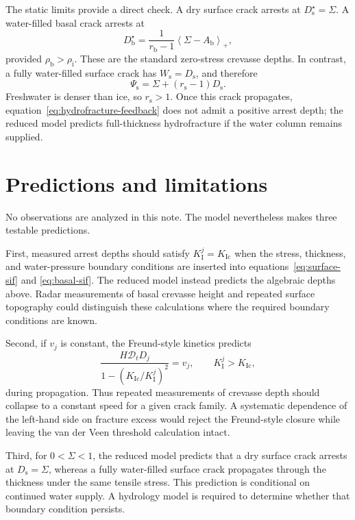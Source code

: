 \documentclass[11pt]{article}
\newcommand{\Dt}{\mathcal{D}_t}
\newcommand{\pos}[1]{\left\langle #1\right\rangle_{+}}
\newcommand{\rmi}{\mathrm{i}}
\newcommand{\rms}{\mathrm{s}}
\newcommand{\rmb}{\mathrm{b}}
\newcommand{\KI}[1]{K_{\mathrm{I}}^{#1}}
\newcommand{\KIc}{K_{\mathrm{Ic}}}
\begin{document}
The static limits provide a direct check.  A dry surface crack arrests at
\(D_{\rms}^{\star}=\Sigma\).  A water-filled basal crack arrests at
\begin{equation}
 D_{\rmb}^{\star}
 =\frac{1}{r_{\rmb}-1}\pos{\Sigma-A_{\rmb}},
 \label{eq:basal-arrest}
\end{equation}
provided \(\rho_{\rmb}>\rho_{\rmi}\).  These are the standard zero-stress
crevasse depths.  In contrast, a fully water-filled surface crack has
\(W_{\rms}=D_{\rms}\), and therefore
\begin{equation}
 \Psi_{\rms}=\Sigma+(r_{\rms}-1)D_{\rms}.
 \label{eq:hydrofracture-feedback}
\end{equation}
Freshwater is denser than ice, so \(r_{\rms}>1\).  Once this crack propagates,
equation~\eqref{eq:hydrofracture-feedback} does not admit a positive arrest
depth; the reduced model predicts full-thickness hydrofracture if the water
column remains supplied.

\section{Predictions and limitations}

No observations are analyzed in this note.  The model nevertheless makes
three testable predictions.

First, measured arrest depths should satisfy \(\KI{j}=\KIc\) when the stress,
thickness, and water-pressure boundary conditions are inserted into
equations~\eqref{eq:surface-sif} and \eqref{eq:basal-sif}.  The reduced model
instead predicts the algebraic depths above.  Radar measurements of basal
crevasse height and repeated surface topography could distinguish these
calculations where the required boundary conditions are known.

Second, if \(v_j\) is constant, the Freund-style kinetics predicts
\begin{equation}
 \frac{H\Dt D_j}{1-(\KIc/\KI{j})^2}=v_j,
 \qquad \KI{j}>\KIc,
 \label{eq:rate-prediction}
\end{equation}
during propagation.  Thus repeated measurements of crevasse depth should
collapse to a constant speed for a given crack family.  A systematic
dependence of the left-hand side on fracture excess would reject the
Freund-style closure while leaving the van der Veen threshold calculation
intact.

Third, for \(0<\Sigma<1\), the reduced model predicts that a dry surface crack
arrests at \(D_{\rms}=\Sigma\), whereas a fully water-filled surface crack
propagates through the thickness under the same tensile stress.  This
prediction is conditional on continued water supply.  A hydrology model is
required to determine whether that boundary condition persists.
\end{document}
